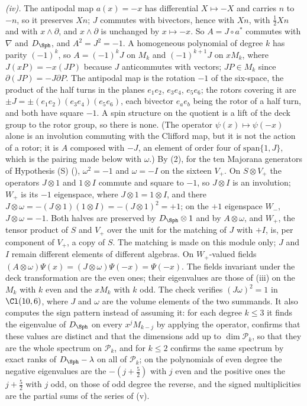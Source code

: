\emph{(iv).} The antipodal map $a(x) = -x$ has differential $X \mapsto -X$ and carries $n$ to $-n$, so it preserves $Xn$; $J$ commutes with bivectors, hence with $Xn$, with $\tfrac12Xn$ and with $x \wedge \partial$, and $x \wedge \partial$ is unchanged by $x \mapsto -x$. So $A = J \circ a^{*}$ commutes with $\nabla$ and $D_{\Sph}$, and $A^{2} = J^{2} = -1$. A homogeneous polynomial of degree $k$ has parity $(-1)^{k}$, so $A = (-1)^{k}J$ on $M_{k}$ and $(-1)^{k+1}J$ on $xM_{k}$, where $J(xP) = -x(JP)$ because $J$ anticommutes with vectors; $JP \in M_{k}$ since $\partial(JP) = -J\partial P$. The antipodal map is the rotation $-1$ of the six-space, the product of the half turns in the planes $e_{1}e_{2}$, $e_{3}e_{4}$, $e_{5}e_{6}$; the rotors covering it are $\pm J = \pm(e_{1}e_{2})(e_{3}e_{4})(e_{5}e_{6})$, each bivector $e_{a}e_{b}$ being the rotor of a half turn, and both have square $-1$. A spin structure on the quotient is a lift of the deck group to the rotor group, so there is none. (The operator $\psi(x) \mapsto \psi(-x)$ alone is an involution commuting with the Clifford map, but it is not the action of a rotor; it is $A$ composed with $-J$, an element of order four of $\mathrm{span}\{1, J\}$, which is the pairing made below with $\omega$.) By (2), for the ten Majorana generators of Hypothesis (S) (), $\omega^{2} = -1$ and $\omega = -I$ on the sixteen $V_{+}$. On $S \otimes V_{+}$ the operators $J \otimes 1$ and $1 \otimes I$ commute and square to $-1$, so $J \otimes I$ is an involution; $W_{+}$ is its $-1$ eigenspace, where $J \otimes 1 = 1 \otimes I$, and there $J \otimes \omega = -(J \otimes 1)(1 \otimes I) = -(J \otimes 1)^{2} = +1$; on the $+1$ eigenspace $W_{-}$, $J \otimes \omega = -1$. Both halves are preserved by $D_{\Sph} \otimes 1$ and by $A \otimes \omega$, and $W_{+}$, the tensor product of $S$ and $V_{+}$ over the unit for the matching of $J$ with $+I$, is, per component of $V_{+}$, a copy of $S$. The matching is made on this module only; $J$ and $I$ remain different elements of different algebras. On $W_{+}$-valued fields $(A \otimes \omega)\Psi(x) = (J \otimes \omega)\Psi(-x) = \Psi(-x)$. The fields invariant under the deck transformation are the even ones; their eigenvalues are those of (iii) on the $M_{k}$ with $k$ even and the $xM_{k}$ with $k$ odd. The check verifies $(J\omega)^{2} = 1$ in $\Cl(10,6)$, where $J$ and $\omega$ are the volume elements of the two summands. It also computes the sign pattern instead of assuming it: for each degree $k \le 3$ it finds the eigenvalue of $D_{\Sph}$ on every $x^{j}M_{k-j}$ by applying the operator, confirms that these values are distinct and that the dimensions add up to $\dim\mathcal{P}_{k}$, so that they are the whole spectrum on $\mathcal{P}_{k}$, and for $k \le 2$ confirms the same spectrum by exact ranks of $D_{\Sph} - \lambda$ on all of $\mathcal{P}_{k}$; on the polynomials of even degree the negative eigenvalues are the $-(j + \tfrac52)$ with $j$ even and the positive ones the $j + \tfrac52$ with $j$ odd, on those of odd degree the reverse, and the signed multiplicities are the partial sums of the series of (v).

